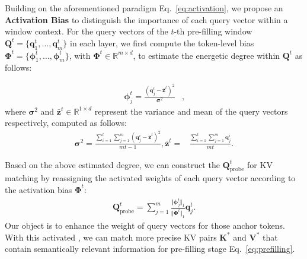 Building on the aforementioned paradigm Eq.~\ref{eq:activation}, we propose an \textbf{Activation Bias} to distinguish the importance of each query vector within a window context. For the query vectors of the $t$-th pre-filling window $\mathbf{Q}^{t} = \{\mathbf{q}^{t}_{1}, \dots, \mathbf{q}^{t}_{m}\}$ in each layer, we first compute the token-level bias $\mathbf{\Phi}^t = \{\mathbf{\phi}^{t}_{1}, \dots, \mathbf{\phi}^{t}_{m}\}$, with $\mathbf{\Phi}^t \in \mathbb{R}^{m \times d}$, to estimate the energetic degree within $\mathbf{Q}^{t}$ as follows:

\begin{equation}
\begin{aligned}
\mathbf{\phi}^t_j = \frac{(\mathbf{q}^{t}_{j} - {\mathbf{\bar{z}}^t})^2}{\mathbf{\sigma}^2}&,
\end{aligned}
\end{equation}
where $\mathbf{\sigma}^2$ and $\mathbf{\bar{z}}^t \in \mathbb{R}^{1 \times d}$ represent the variance and mean of the query vectors respectively, computed as follows:
\begin{equation}
\begin{aligned}
\mathbf{\sigma}^2 = \frac{\sum_{i=1}^{t} \sum_{j=1}^{m} \left( \mathbf{q}^i_j - \mathbf{\bar{z}}^t \right)^2}{mt-1},\mathbf{\bar{z}}^t =&\frac{\sum_{i=1}^{t}\sum_{j=1}^{m} \mathbf{q}^i_j}{mt}.
\end{aligned}
\end{equation}

Based on the above estimated degree, we can construct the \pq $\mathbf{Q}^{t}_{\text{probe}}$ for KV matching by reassigning the activated weights of each query vector according to the activation bias $\mathbf{\Phi}^t$:
\begin{equation}
\begin{aligned}
\mathbf{Q}^{t}_{\text{probe}} = \sum_{j=1}^{m}\frac{\Vert \mathbf{\phi}^t_j \Vert_1}{\Vert \mathbf{\Phi}^t \Vert_1}\mathbf{q}^{t}_{j}.
\end{aligned}
\end{equation}
Our object is to enhance the weight of query vectors for those anchor tokens. With this activated \pq, we can match more precise KV pairs $\mathbf{K}^{*}$ and $\mathbf{V}^{*}$ that contain semantically relevant information for pre-filling stage Eq.~\ref{eq:prefilling}.

